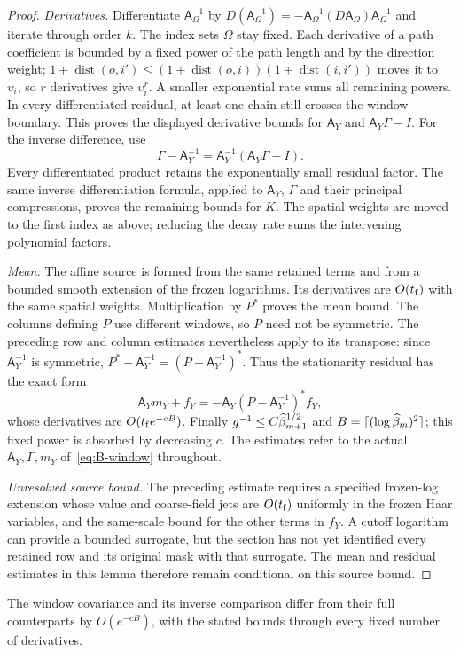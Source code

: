 \begin{proof}
\emph{Derivatives.} Differentiate $\mathsf A_\Omega^{-1}$ by $D(\mathsf A_\Omega^{-1})=-\mathsf A_\Omega^{-1}(D\mathsf A_\Omega)\mathsf A_\Omega^{-1}$ and iterate through order $k$. The index sets $\Omega$ stay fixed. Each derivative of a path coefficient is bounded by a fixed power of the path length and by the direction weight; $1+\operatorname{dist}(o,i')\le(1+\operatorname{dist}(o,i))(1+\operatorname{dist}(i,i'))$ moves it to~$\upsilon_i$, so $r$ derivatives give $\upsilon_i^r$. A smaller exponential rate sums all remaining powers. In every differentiated residual, at least one chain still crosses the window boundary. This proves the displayed derivative bounds for $\mathsf A_Y$ and $\mathsf A_Y\Gamma-I$. For the inverse difference, use
\begin{equation*}
\Gamma-\mathsf A_Y^{-1}=\mathsf A_Y^{-1}(\mathsf A_Y\Gamma-I).
\end{equation*}
Every differentiated product retains the exponentially small residual factor. The same inverse differentiation formula, applied to $\mathsf A_Y$, $\Gamma$ and their principal compressions, proves the remaining bounds for $K$. The spatial weights are moved to the first index as above; reducing the decay rate sums the intervening polynomial factors.

\emph{Mean.} The affine source is formed from the same retained terms and from a bounded smooth extension of the frozen logarithms. Its derivatives are $O(t_{\rm f})$ with the same spatial weights. Multiplication by $P^*$ proves the mean bound. The columns defining $P$ use different windows, so $P$ need not be symmetric. The preceding row and column estimates nevertheless apply to its transpose: since $\mathsf A_Y^{-1}$ is symmetric, $P^*-\mathsf A_Y^{-1}=(P-\mathsf A_Y^{-1})^*$. Thus the stationarity residual has the exact form
\begin{equation*}
\mathsf A_Ym_Y+f_Y=-\mathsf A_Y(P-\mathsf A_Y^{-1})^*f_Y,
\end{equation*}
whose derivatives are $O(t_{\rm f}e^{-cB})$. Finally $g^{-1}\le C\widehat{\beta}_{m+1}^{1/2}$ and $B=\lceil(\log\widehat{\beta}_m)^2\rceil$; this fixed power is absorbed by decreasing $c$. The estimates refer to the actual $\mathsf A_Y,\Gamma,m_Y$ of~\eqref{eq:B-window} throughout.

\emph{Unresolved source bound.} The preceding estimate requires a specified frozen-log extension whose value and coarse-field jets are $O(t_{\rm f})$ uniformly in the frozen Haar variables, and the same-scale bound for the other terms in $f_Y$. A cutoff logarithm can provide a bounded surrogate, but the section has not yet identified every retained row and its original mask with that surrogate. The mean and residual estimates in this lemma therefore remain conditional on this source bound.
\end{proof}
The window covariance and its inverse comparison differ from their full counterparts by $O(e^{-cB})$, with the stated bounds through every fixed number of derivatives.

